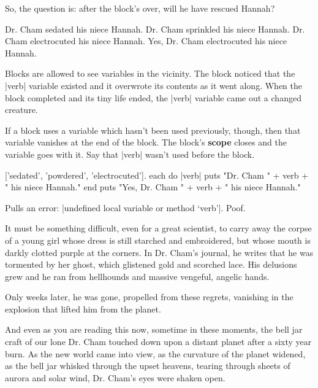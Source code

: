 \documentclass[12pt,twoside]{report}
\begin{document}
So, the question is: after the block's over, will he have rescued
Hannah?


\begin{rubycode}

 Dr. Cham sedated his niece Hannah.
 Dr. Cham sprinkled his niece Hannah.
 Dr. Cham electrocuted his niece Hannah.
 Yes, Dr. Cham electrocuted his niece Hannah.

\end{rubycode}


Blocks are allowed to see variables in the vicinity.  The block
noticed that the \rubyinline|verb| variable existed
and it overwrote its contents as it went along.  When the block
completed and its tiny life ended, the
\rubyinline|verb| variable came out a changed
creature.

If a block uses a variable which hasn't been used previously, though,
then that variable vanishes at the end of the block.  The block's {\bf
  scope} closes and the variable goes with it.  Say that
\rubyinline|verb| wasn't used before the block.


\begin{rubycode}

 ['sedated', 'powdered', 'electrocuted'].
 each do |verb|
   puts "Dr. Cham " + verb + " his niece Hannah."
 end
 puts "Yes, Dr. Cham " + verb + " his niece Hannah."

\end{rubycode}

Pulls an error: 
\rubyinline|undefined local variable or method `verb'|.  
Poof.

It must be something difficult, even for a great scientist, to carry
away the corpse of a young girl whose dress is still starched and
embroidered, but whose mouth is darkly clotted purple at the corners.
In Dr. Cham's journal, he writes that he was tormented by her ghost,
which glistened gold and scorched lace.  His delusions grew and he ran
from hellhounds and massive vengeful, angelic hands.

Only weeks later, he was gone, propelled from these regrets, vanishing
in the explosion that lifted him from the planet.

And even as you are reading this now, sometime in these moments, the
bell jar craft of our lone Dr. Cham touched down upon a distant planet
after a sixty year burn.  As the new world came into view, as the
curvature of the planet widened, as the bell jar whisked through the
upset heavens, tearing through sheets of aurora and solar wind,
Dr. Cham's eyes were shaken open.
\end{document}
